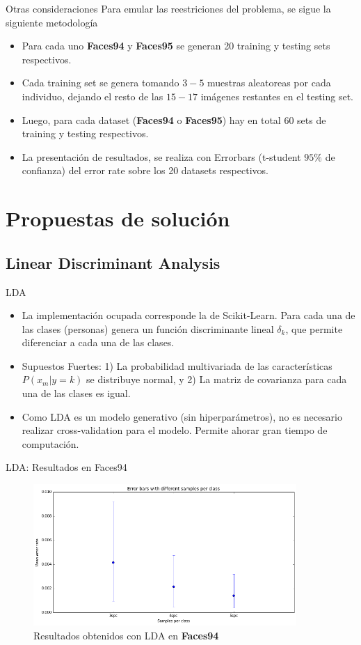 \documentclass{beamer}
\begin{document}
\begin{frame}{Otras consideraciones}
 Para emular las reestriciones del problema, se sigue la siguiente metodología
 \begin{itemize}
 	\item Para cada uno \textbf{Faces94} y \textbf{Faces95} se generan 20 training y testing sets respectivos.
 	\item Cada training set se genera tomando $3-5$ muestras aleatoreas por cada individuo, dejando el resto de las $15-17$ imágenes restantes en el testing set. 
 	\item Luego, para cada dataset (\textbf{Faces94} o \textbf{Faces95}) hay en total $60$ sets de training y testing
 	respectivos.
 	\item La presentación de resultados, se realiza con Errorbars (t-student $95\%$ de confianza) del error rate sobre los 20 datasets respectivos. 
 \end{itemize}
\end{frame}

\section{Propuestas de solución}

\subsection{Linear Discriminant Analysis}
\begin{frame}{LDA}
\begin{itemize}
	\item La implementación ocupada corresponde la de Scikit-Learn. Para cada una de las clases (personas) genera un función discriminante lineal $\delta_k$, que permite diferenciar a cada una de las clases. 
	\item Supuestos Fuertes: 1) La probabilidad multivariada de las características $P(x_m | y=k)$ se distribuye normal, y  2) La matriz de covarianza para cada una de las clases es igual.
	\item Como LDA es un modelo generativo (sin hiperparámetros), no es necesario realizar cross-validation para el modelo. Permite ahorar gran tiempo de computación.
\end{itemize}
\end{frame}

\begin{frame}{LDA: Resultados en Faces94}
\begin{figure}[htpb!]
\centering
\includegraphics[width=10cm]{lda_res94}
\caption{Resultados obtenidos con LDA en \textbf{Faces94}}
\end{figure}
\end{frame}
\end{document}
